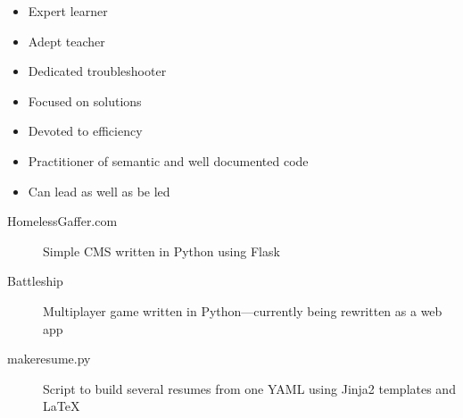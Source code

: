 \documentclass[letterpaper]{article}        %
\begin{document}
\begin{multicols}{3}
      \begin{itemize}
            \end{itemize}
    
      \begin{itemize}
        \item Expert learner
        \item Adept teacher
        \item Dedicated troubleshooter
        \item Focused on solutions
        \item Devoted to efficiency
        \item Practitioner of semantic and well documented code
        \item Can lead as well as be led
        \end{itemize}
    
    
  \end{multicols}


  \begin{description}
    \item[HomelessGaffer.com] Simple CMS written in Python using Flask
    \item[Battleship] Multiplayer game written in Python---currently being rewritten as a web app
    \item[makeresume.py] Script to build several resumes from one YAML using Jinja2 templates and \LaTeX{}
    
  \end{description}
\end{document}
